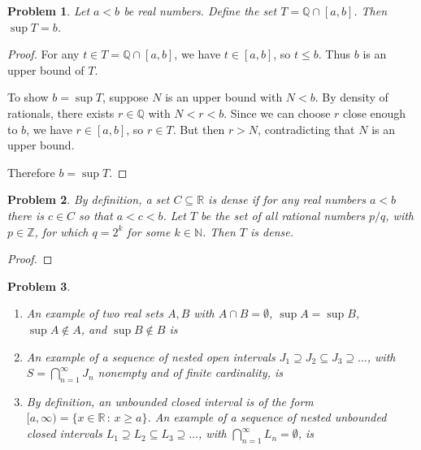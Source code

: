 \documentclass[12pt]{article}
\newtheorem{problem}{Problem}
\newcommand{\NN}{\ensuremath{\mathbb N}}
\newcommand{\QQ}{\ensuremath{\mathbb Q}}
\newcommand{\RR}{\ensuremath{\mathbb R}}
\newcommand{\ZZ}{\ensuremath{\mathbb Z}}
\begin{document}
\begin{problem} %
Let $a<b$ be real numbers.  Define the set $T=\QQ \cap [a,b]$.  Then $\sup T = b$.
\end{problem}


\begin{proof}
For any $t \in T = \mathbb{Q} \cap [a,b]$, we have $t \in [a,b]$, so $t \leq b$. Thus $b$ is an upper bound of $T$.

To show $b = \sup T$, suppose $N$ is an upper bound with $N < b$. By density of rationals, there exists $r \in \mathbb{Q}$ with $N < r < b$. Since we can choose $r$ close enough to $b$, we have $r \in [a,b]$, so $r \in T$. But then $r > N$, contradicting that $N$ is an upper bound.

Therefore $b = \sup T$.
\end{proof}


\begin{problem} %
By definition, a set $C\subseteq \RR$ is \emph{dense} if for any real numbers $a<b$ there is $c\in C$ so that $a<c<b$.  Let $T$ be the set of all rational numbers $p/q$, with $p\in\ZZ$, for which $q=2^k$ for some $k\in\NN$.  Then $T$ is dense.
\end{problem}


\begin{proof}
\end{proof}


\begin{problem} %
\phantom{foo}

\renewcommand{\labelenumi}{(\alph{enumi})}
\begin{enumerate}
\item An example of two real sets $A,B$ with $A\cap B=\emptyset$, $\sup A = \sup B$, $\sup A \notin A$, and $\sup B \notin B$ is
\item An example of a sequence of nested open intervals $J_1\supseteq J_2 \subseteq J_3 \supseteq \dots$, with $S=\bigcap_{n=1}^\infty J_n$ nonempty and of finite cardinality, is
\item By definition, an unbounded closed interval is of the form $[a,\infty) = \{x\in\RR \,:\, x \ge a\}$.  An example of a sequence of nested unbounded closed intervals $L_1\supseteq L_2 \subseteq L_3 \supseteq \dots$, with $\bigcap_{n=1}^\infty L_n = \emptyset$, is
\end{enumerate}
\end{problem}
\end{document}
